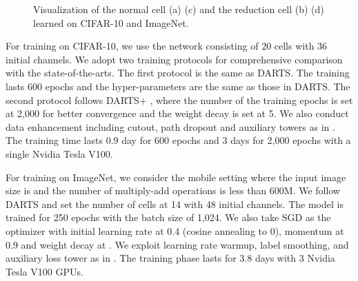 \documentclass[journal]{IEEEtran}
\begin{document}
\begin{figure*}[!htbp]
   \caption{Visualization of the normal cell (a) (c) and the reduction cell (b) (d) learned on CIFAR-10 and ImageNet.}
\label{fig:S0}
\end{figure*}

For training on CIFAR-10, we use the network consisting of 20 cells with 36 initial channels. We adopt two training protocols for comprehensive comparison with the state-of-the-arts. The first protocol is the same as DARTS. The training lasts 600 epochs and the hyper-parameters are the same as those in DARTS. The second protocol follows DARTS+ \cite {DBLP:journals/corr/abs-1909-06035}, where the number of the training epochs is set at 2,000 for better convergence and the weight decay is set at 5. We also conduct data enhancement including cutout, path dropout and auxiliary towers as in \cite{DBLP:journals/corr/abs-1909-06035,DBLP:journals/corr/abs-1910-11831,DBLP:journals/corr/abs-1909-09656,DBLP:journals/corr/abs-1904-12760,DBLP:conf/iclr/LiuSY19}. The training time lasts 0.9 day for 600 epochs and 3 days for 2,000 epochs with a single Nvidia Tesla V100.  


For training on ImageNet, we consider the mobile setting where the input image size is  and the number of multiply-add operations is less than 600M. We follow DARTS and set the number of cells at 14 with 48 initial channels. The model is trained for 250 epochs with the batch size of 1,024. We also take SGD as the optimizer with initial learning rate at 0.4 (cosine annealing to 0), momentum at 0.9 and weight decay at . We exploit learning rate warmup, label smoothing, and auxiliary loss tower as in \cite{DBLP:journals/corr/abs-1909-06035,DBLP:journals/corr/abs-1910-11831,DBLP:journals/corr/abs-1909-09656,DBLP:journals/corr/abs-1904-12760,DBLP:conf/iclr/LiuSY19}. The training phase lasts for 3.8 days with 3 Nvidia Tesla V100 GPUs. 
\end{document}
